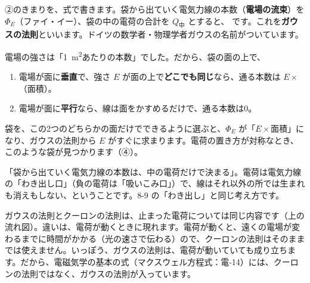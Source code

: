 
\label{ph:電-2:sec3}
②のきまりを、式で書きます。袋から出ていく電気力線の本数（\textbf{電場の流束}）を $\Phi_E$（ファイ・イー）、袋の中の電荷の合計を $Q_{\text{中}}$ とすると、
\label{ph:電-2:gauss}です。これを\textbf{ガウスの法則}といいます。ドイツの数学者・物理学者ガウスの名前がついています。

電場の強さは「\qty{1}{m^2}あたりの本数」でした。だから、袋の面の上で、
\begin{enumerate}[label={\bkcircled{\arabic*}}, leftmargin=2.4\zw, itemsep=1pt, topsep=2pt]
\item 電場が面に\textbf{垂直}で、強さ $E$ が面の上で\textbf{どこでも同じ}なら、通る本数は $E\times$（面積）。
\item 電場が面に\textbf{平行}なら、線は面をかすめるだけで、通る本数は0。
\end{enumerate}
袋を、この2つのどちらかの面だけでできるように選ぶと、$\Phi_E$ が「$E\times$面積」になり、ガウスの法則から $E$ がすぐに求まります。電荷の置き方が対称なとき、このような袋が見つかります（④）。

\begin{phflow}[ガウスの法則からクーロンの法則へ]
\end{phflow}

\begin{phyomi}[$\Phi_E=Q_{\text{中}}/\varepsilon_0$]
「袋から出ていく電気力線の本数は、中の電荷だけで決まる」。電荷は電気力線の「わき出し口」（負の電荷は「吸いこみ口」）で、線はそれ以外の所では生まれも消えもしない、ということです。8-9 の「わき出し」と同じ考え方です。
\end{phyomi}

\begin{seikaku}
ガウスの法則とクーロンの法則は、止まった電荷については同じ内容です（上の流れ図）。違いは、電荷が動くときに現れます。電荷が動くと、遠くの電場が変わるまでに時間がかかる（光の速さで伝わる）ので、クーロンの法則はそのままでは使えません。いっぽう、ガウスの法則は、電荷が動いていても成り立ちます。だから、電磁気学の基本の式（マクスウェル方程式：電-14）には、クーロンの法則ではなく、ガウスの法則が入っています。
\end{seikaku}

